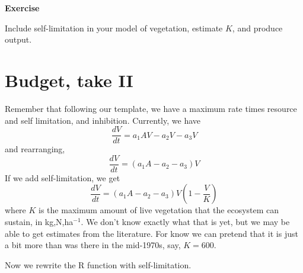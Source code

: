 \documentclass[
]{book}
\begin{document}
\textbf{Exercise}

Include self-limitation in your model of vegetation, estimate \(K\), and produce output.

\hypertarget{budget-take-ii}{%
\section{Budget, take II}\label{budget-take-ii}}

Remember that following our template, we have a maximum rate times resource and self limitation, and inhibition. Currently, we have
\[\frac{dV}{dt} = a_{1}AV - a_{2}V - a_3 V\]
and rearranging,
\[\frac{dV}{dt} = \left(a_{1}A - a_{2} - a_3\right) V\]
If we add self-limitation, we get
\[\frac{dV}{dt} = \left(a_{1}A - a_{2} - a_3\right) V \left(1-\frac{V}{K}\right)\]
where \(K\) is the maximum amount of live vegetation that the ecosystem can sustain, in kg,N,ha\(^{-1}\). We don't know exactly what that is yet, but we may be able to get estimates from the literature. For know we can pretend that it is just a bit more than was there in the mid-1970s, say, \(K=600\).

Now we rewrite the R function with self-limitation.
\end{document}
